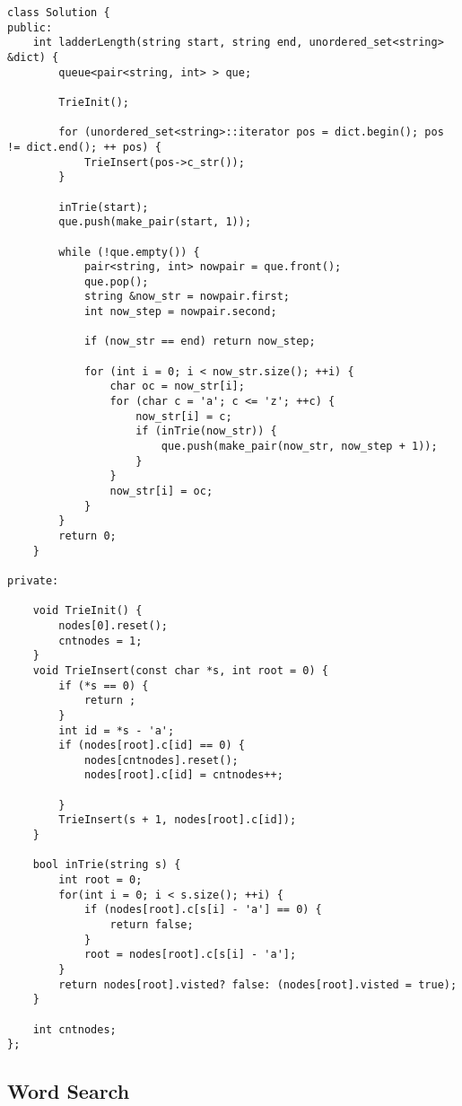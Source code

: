 \documentclass[courier]{article}
\begin{document}
\begin{CJK*}{UTF8}{gkai}
\begin{lstlisting}
class Solution {
public:
    int ladderLength(string start, string end, unordered_set<string> &dict) {
        queue<pair<string, int> > que;
        
        TrieInit();
        
        for (unordered_set<string>::iterator pos = dict.begin(); pos != dict.end(); ++ pos) {
            TrieInsert(pos->c_str());
        }
        
        inTrie(start);
        que.push(make_pair(start, 1));
        
        while (!que.empty()) {
            pair<string, int> nowpair = que.front();
            que.pop();
            string &now_str = nowpair.first;
            int now_step = nowpair.second;
            
            if (now_str == end) return now_step;
            
            for (int i = 0; i < now_str.size(); ++i) {
                char oc = now_str[i];
                for (char c = 'a'; c <= 'z'; ++c) {
                    now_str[i] = c;
                    if (inTrie(now_str)) {
                        que.push(make_pair(now_str, now_step + 1));
                    }
                }
                now_str[i] = oc;
            }
        }
        return 0;
    }
    
private:
    
    void TrieInit() {
        nodes[0].reset();
        cntnodes = 1;
    }
    void TrieInsert(const char *s, int root = 0) {
        if (*s == 0) {
            return ;
        }
        int id = *s - 'a';
        if (nodes[root].c[id] == 0) {
            nodes[cntnodes].reset();
            nodes[root].c[id] = cntnodes++;
            
        }
        TrieInsert(s + 1, nodes[root].c[id]);
    }
    
    bool inTrie(string s) {
        int root = 0;
        for(int i = 0; i < s.size(); ++i) {
            if (nodes[root].c[s[i] - 'a'] == 0) {
                return false;
            }
            root = nodes[root].c[s[i] - 'a'];
        }
        return nodes[root].visted? false: (nodes[root].visted = true);
    }
    
    int cntnodes;
};

\end{lstlisting}


\subsection{ Word Search }


\end{CJK*}
\end{document}
